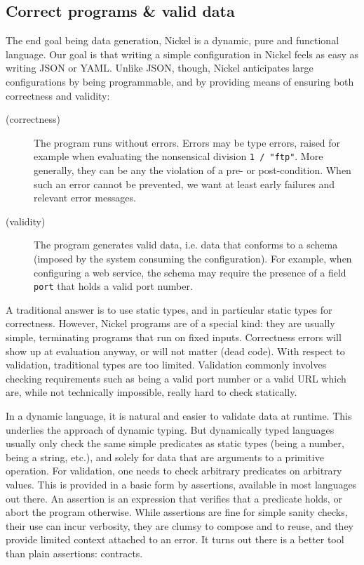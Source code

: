 \documentclass[sigplan,10pt,review,anonymous]{acmart}
\newcommand{\nickel}[1]{\lstinline[language=nickel]{#1}}
\begin{document}
\subsection*{Correct programs \& valid data}

The end goal being data generation, Nickel is a dynamic, pure and functional
language. Our goal is that writing a simple configuration in Nickel feels as
easy as writing JSON or YAML. Unlike JSON, though, Nickel anticipates large
configurations by being programmable, and by providing means of ensuring
both correctness and validity:

\begin{description}
    \item[(correctness)] The program runs without errors. Errors may be type
        errors, raised for example when evaluating the nonsensical division
        \nickel{1 / "ftp"}. More generally, they can be any the violation of a
        pre- or post-condition. When such an error cannot be prevented, we want
        at least early failures and relevant error messages.
    \item[(validity)] The program generates valid data, i.e. data that conforms
        to a schema (imposed by the system consuming the configuration). For
        example, when configuring a web service, the schema may require the
        presence of a field \lstinline+port+ that holds a valid port number.
\end{description}

A traditional answer is to use static types, and in particular static types for
correctness. However, Nickel programs are of a special kind: they are usually
simple, terminating programs that run on fixed inputs. Correctness errors will
show up at evaluation anyway, or will not matter (dead code). With respect to
validation, traditional types are too limited. Validation commonly involves
checking requirements such as being a valid port number or a valid URL which
are, while not technically impossible, really hard to check statically.

In a dynamic language, it is natural and easier to validate data at runtime.
This underlies the approach of dynamic typing. But dynamically typed languages
usually only check the same simple predicates as static types (being a number,
being a string, etc.), and solely for data that are arguments to a primitive
operation. For validation, one needs to check arbitrary predicates on arbitrary
values. This is provided in a basic form by assertions, available in most
languages out there. An assertion is an expression that verifies that a
predicate holds, or abort the program otherwise.  While assertions are fine for
simple sanity checks, their use can incur verbosity, they are clumsy to compose
and to reuse, and they provide limited context attached to an error. It turns
out there is a better tool than plain assertions: contracts.
\end{document}

